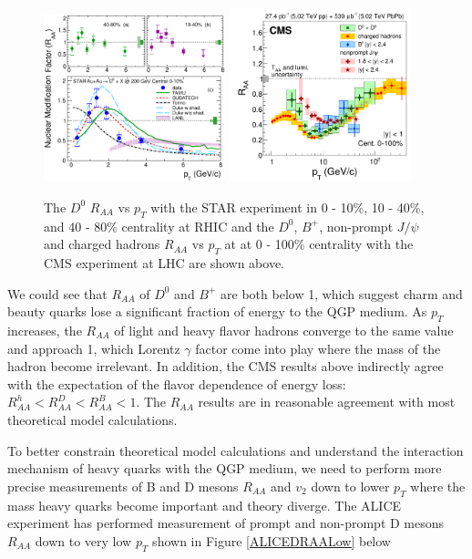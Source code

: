 \begin{figure}[hbtp]
\begin{center}
\includegraphics[width=0.47\textwidth]{Figures/Chapter2/STARRAA.eps}
\includegraphics[width=0.47\textwidth]{Figures/Chapter2/CMSRAA.png}
\caption{The $D^0$ $R_{AA}$ vs $p_T$ with the STAR experiment in 0 - 10\%, 10 - 40\%, and 40 - 80\% centrality at RHIC and the $D^0$, $B^+$, non-prompt $J/\psi$ and charged hadrons $R_{AA}$ vs $p_T$ at at 0 - 100\% centrality with the CMS experiment at LHC are shown above.}
\label{HQRAA}
\end{center}
\end{figure}   

We could see that $R_{AA}$ of $D^0$ and $B^+$ are both below 1, which suggest charm and beauty quarks lose a significant fraction of energy to the QGP medium. As $p_T$ increases, the $R_{AA}$ of light and heavy flavor hadrons converge to the same value and approach 1, which Lorentz $\gamma$ factor come into play where the mass of the hadron become irrelevant. In addition, the CMS results above indirectly agree with the expectation of the flavor dependence of energy loss: $R_{AA}^{h} < R_{AA}^{D} < R_{AA}^{B} < 1$. The $R_{AA}$ results are in reasonable agreement with most theoretical model calculations. 

To better constrain theoretical model calculations and understand the interaction mechanism of heavy quarks with the QGP medium, we need to perform more precise measurements of B and D mesons $R_{AA}$ and $v_2$ down to lower $p_T$ where the mass heavy quarks become important and theory diverge. The ALICE experiment has performed measurement of prompt and non-prompt D mesons $R_{AA}$ down to very low $p_T$ shown in Figure \ref{ALICEDRAALow} below


